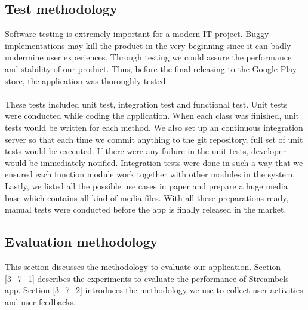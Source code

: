 \subsection{Test methodology\label{3_6}}
Software testing is extremely important for a modern IT project. Buggy implementations may kill the product in the very beginning since it can badly undermine user experiences. Through testing we could assure the performance and stability of our product. Thus, before the final releasing to the Google Play store, the application was thoroughly tested.\\
\\
These tests included unit test, integration test and functional test.
Unit tests were conducted while coding the application. When each class was finished, unit tests would be written for each method. We also set up an continuous integration server so that each time we commit anything to the git repository, full set of unit tests would be executed. If there were any failure in the unit tests, developer would be immediately notified. Integration tests were done in such a way that we ensured each function module work together with other modules in the system. Lastly, we listed all the possible use cases in paper and prepare a huge media base which contains all kind of media files. With all these preparations ready, manual tests were conducted before the app is finally released in the market.

\subsection{Evaluation methodology\label{3_7}}
This section discusses the methodology to evaluate our application. Section
\ref{3_7_1} describes the experiments to evaluate the performance of Streambels
app. Section \ref{3_7_2} introduces the methodology we use to collect user
activities and user feedbacks.

